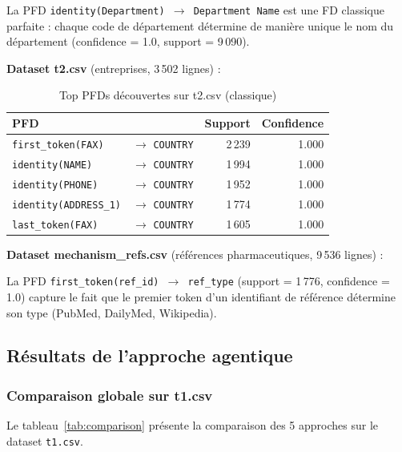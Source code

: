 \documentclass[12pt,a4paper]{article}
\begin{document}
La PFD \texttt{identity(Department) $\rightarrow$ Department Name} est une FD classique parfaite : chaque code de d\'{e}partement d\'{e}termine de mani\`{e}re unique le nom du d\'{e}partement (confidence = 1.0, support = 9\,090).

\textbf{Dataset t2.csv} (entreprises, 3\,502 lignes) :

\begin{table}[H]
\centering
\caption{Top PFDs d\'{e}couvertes sur t2.csv (classique)}
\begin{tabular}{@{}llrr@{}}
\toprule
\textbf{PFD} & & \textbf{Support} & \textbf{Confidence} \\
\midrule
\texttt{first\_token(FAX)} & $\rightarrow$ \texttt{COUNTRY} & 2\,239 & 1.000 \\
\texttt{identity(NAME)} & $\rightarrow$ \texttt{COUNTRY} & 1\,994 & 1.000 \\
\texttt{identity(PHONE)} & $\rightarrow$ \texttt{COUNTRY} & 1\,952 & 1.000 \\
\texttt{identity(ADDRESS\_1)} & $\rightarrow$ \texttt{COUNTRY} & 1\,774 & 1.000 \\
\texttt{last\_token(FAX)} & $\rightarrow$ \texttt{COUNTRY} & 1\,605 & 1.000 \\
\bottomrule
\end{tabular}
\end{table}

\textbf{Dataset mechanism\_refs.csv} (r\'{e}f\'{e}rences pharmaceutiques, 9\,536 lignes) :

La PFD \texttt{first\_token(ref\_id) $\rightarrow$ ref\_type} (support = 1\,776, confidence = 1.0) capture le fait que le premier token d'un identifiant de r\'{e}f\'{e}rence d\'{e}termine son type (PubMed, DailyMed, Wikipedia).

\subsection{R\'{e}sultats de l'approche agentique}

\subsubsection{Comparaison globale sur t1.csv}

Le tableau~\ref{tab:comparison} pr\'{e}sente la comparaison des 5 approches sur le dataset \texttt{t1.csv}.
\end{document}
